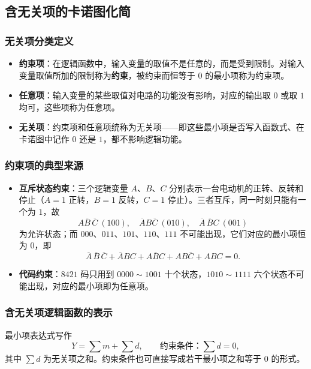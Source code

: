 \subsection{含无关项的卡诺图化简}
\subsubsection{无关项分类定义}
\begin{itemize}
    \item \textbf{约束项}：在逻辑函数中，输入变量的取值不是任意的，而是受到限制。对输入变量取值所加的限制称为\textbf{约束}，被约束而恒等于 $0$ 的最小项称为约束项。
    \item \textbf{任意项}：输入变量的某些取值对电路的功能没有影响，对应的输出取 $0$ 或取 $1$ 均可，这些项称为任意项。
    \item \textbf{无关项}：约束项和任意项统称为无关项——即这些最小项是否写入函数式、在卡诺图中记作 $0$ 还是 $1$，都不影响逻辑功能。
\end{itemize}

\subsubsection{约束项的典型来源}
\begin{itemize}
    \item \textbf{互斥状态约束}：三个逻辑变量 $A$、$B$、$C$ 分别表示一台电动机的正转、反转和停止（$A=1$ 正转，$B=1$ 反转，$C=1$ 停止）。三者互斥，同一时刻只能有一个为 $1$，故
    \[
    A\overline{B}\,\overline{C}\ (100),\quad \overline{A}B\overline{C}\ (010),\quad \overline{A}\,\overline{B}C\ (001)
    \]
    为允许状态；而 $000$、$011$、$101$、$110$、$111$ 不可能出现，它们对应的最小项恒为 $0$，即
    \[
    \overline{A}\,\overline{B}\,\overline{C}+\overline{A}BC+A\overline{B}C+AB\overline{C}+ABC=0 .
    \]
    \item \textbf{代码约束}：$8421$ 码只用到 $0000\sim1001$ 十个状态，$1010\sim1111$ 六个状态不可能出现，对应的最小项即为任意项。
\end{itemize}

\subsubsection{含无关项逻辑函数的表示}
最小项表达式写作
\begin{equation}
Y=\sum m+\sum d,\qquad \text{约束条件：}\sum d=0,
\label{eq:donotcare}
\end{equation}
其中 $\sum d$ 为无关项之和。约束条件也可直接写成若干最小项之和等于 $0$ 的形式。

